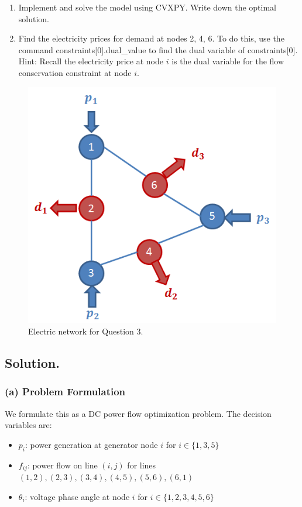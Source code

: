 \documentclass[11pt]{article}
\begin{document}
\begin{enumerate}
\begin{enumerate}
		\item Implement and solve the model using CVXPY. Write down the optimal solution.
		
		\item Find the electricity prices for demand at nodes 2, 4, 6. To do this, use the command \textsf{constraints[0].dual\_value} to find the dual variable of \textsf{constraints[0]}. Hint: Recall the electricity price at node $i$ is the dual variable for the flow conservation constraint at node $i$.
	\end{enumerate}  
	\begin{figure}[h!]
		\centering
		\includegraphics[scale=0.7]{HW5power.png}
		\caption{Electric network for Question 3.}
		\label{fig:power}
	\end{figure}

\subsection*{Solution.}

\subsubsection*{(a) Problem Formulation}

We formulate this as a DC power flow optimization problem. The decision variables are:
\begin{itemize}
    \item $p_i$: power generation at generator node $i$ for $i \in \{1, 3, 5\}$
    \item $f_{ij}$: power flow on line $(i,j)$ for lines $(1,2), (2,3), (3,4), (4,5), (5,6), (6,1)$
    \item $\theta_i$: voltage phase angle at node $i$ for $i \in \{1, 2, 3, 4, 5, 6\}$
\end{itemize}


\end{enumerate}
\end{document}
